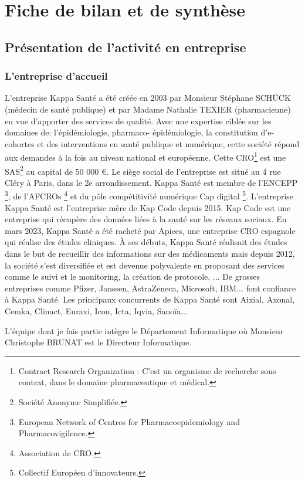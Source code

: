 \section{Fiche de bilan et de synthèse}
\subsection{Présentation de l'activité en entreprise}
\subsubsection{L'entreprise d'accueil}
L’entreprise Kappa Santé a été créée en 2003 par Monsieur Stéphane SCHÜCK (médecin de
santé publique) et par Madame Nathalie TEXIER (pharmacienne) en vue d’apporter des
services de qualité. Avec une expertise ciblée sur les domaines de:
l’épidémiologie, pharmaco- épidémiologie, la constitution d’e-cohortes et des
interventions en santé publique et numérique, cette société répond aux
demandes à la fois au niveau national et européenne.
Cette CRO\footnote{Contract Research Organization : C'est un organisme de recherche sous contrat, dans le domaine pharmaceutique et médical.} est une SAS\footnote{Société Anonyme
Simplifiée.} au capital de 50 000 €.
Le siège social de l’entreprise est situé au 4 rue Cléry à Paris, dans le 2e
arrondissement.
Kappa Santé est membre de l’ENCEPP \footnote{European Network of Centres for
Pharmacoepidemiology and Pharmacovigilence.}, de l’AFCROs \footnote{Association de CRO.} et du pôle compétitivité numérique Cap digital \footnote{Collectif Européen
d’innovateurs.}.
L’entreprise Kappa Santé est l’entreprise mère de Kap Code depuis 2015. Kap
Code est une entreprise qui récupère des données liées à la santé sur les
réseaux sociaux.
En mars 2023, Kappa Santé a été racheté par Apices, une entreprise CRO
espagnole qui réalise des études cliniques.
À ses débuts, Kappa Santé réalisait des études dans le but de recueillir des
informations sur des médicaments mais depuis 2012, la société s’est diversifiée
et est devenue polyvalente en proposant des services comme le suivi et le
monitoring, la création de protocole, ...
De grosses entreprises comme Pfizer, Janssen, AstraZeneca, Microsoft, IBM... font confiance à Kappa Santé. Les principaux concurrents de Kappa Santé sont
Aixial, Axonal, Cemka, Clinact, Euraxi, Icon, Icta, Iqvia, Sanoïa...

L’équipe dont je fais partie intègre le Département Informatique où Monsieur Christophe BRUNAT est le Directeur Informatique.


